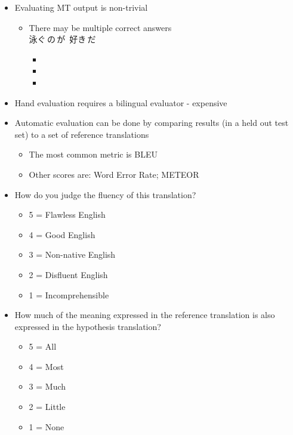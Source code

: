 \documentclass[a4paper,landscape,headrule,footrule,xetex]{foils}
\begin{document}

\begin{itemize}
\item Evaluating MT output is non-trivial
  \begin{itemize}
  \item There may be multiple correct answers
     \makexeCJKactive 
     \\ 泳ぐ\,の\,が\ 好き\,だ 
       \makexeCJKinactive
    \begin{itemize}
    \item {}
    \item {}
    \item {}
    \end{itemize}
  \end{itemize}
\item Hand evaluation requires a bilingual evaluator - expensive
\item Automatic evaluation can be done by comparing results (in a held
  out test  set) to a set of reference translations
  \begin{itemize}
  \item The most common metric is BLEU 
  \item Other scores are: Word Error Rate; METEOR
  \end{itemize}
\end{itemize}



\begin{itemize}
\item {} How do you judge the fluency of this translation?
\begin{itemize}\item 5 = Flawless English 
\item 4 = Good English 
\item 3 = Non-native English 
\item 2 = Disfluent English 
\item 1 = Incomprehensible 
\end{itemize}
\item {} How much of the meaning expressed in the reference
  translation is also expressed in the hypothesis translation? 
\begin{itemize} 
\item 5 = All  
\item 4 = Most  
\item 3 = Much  
\item 2 = Little  
\item 1 = None 
\end{itemize}
\end{itemize}
\end{document}
